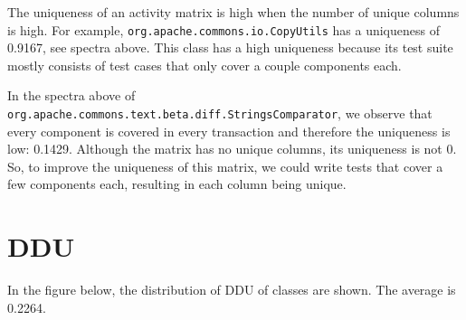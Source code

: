 \documentclass[twoside,a4paper,11pt]{memoir}
\begin{document}
The uniqueness of an activity matrix is high when the number of unique columns is high.
For example, \texttt{org.apache.commons.io.CopyUtils} has a uniqueness of 0.9167, see spectra above.
This class has a high uniqueness because its test suite mostly consists of test cases that only cover a couple components each.

\begin{table}[]
\scriptsize
\centering
\caption{My caption}
\label{my-label}
\noindent{}
\end{table}

In the spectra above of \texttt{org.apache.commons.text.beta.diff.StringsComparator}, we observe that every component is covered in every transaction and therefore the uniqueness is low: 0.1429.
Although the matrix has no unique columns, its uniqueness is not 0.
So, to improve the uniqueness of this matrix, we could write tests that cover a few components each, resulting in each column being unique.

\section{DDU}

In the figure below, the distribution of DDU of classes are shown.
The average is 0.2264.
\end{document}
